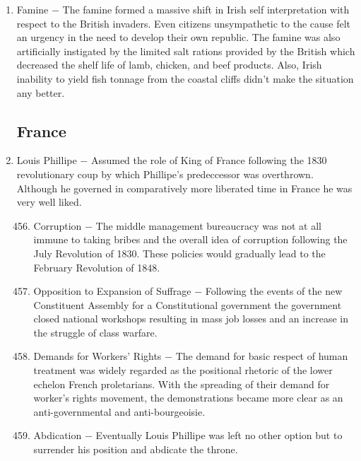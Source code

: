 \documentclass[12pt]{article}
\begin{document}
\begin{enumerate}
\item Famine $-$ The famine formed a massive shift in Irish self interpretation with respect to the British invaders. Even citizens unsympathetic to the cause felt an urgency in the need to develop their own republic. The famine was also artificially instigated by the limited salt rations provided by the British which decreased the shelf life of lamb, chicken, and beef products. Also, Irish inability to yield fish tonnage from the coastal cliffs didn't make the situation any better. 

\subsection{France} 

\item Louis Phillipe $-$ Assumed the role of King of France following the 1830 revolutionary coup by which Phillipe's predeccessor was overthrown. Although he governed in comparatively more liberated time in France he was very well liked.

\begin{enumerate}[label=\arabic{*}.]
\setcounter{enumii}{455}

\item Corruption $-$ The middle management bureaucracy was not at all immune to taking bribes and the overall idea of corruption following the July Revolution of 1830. These policies would gradually lead to the February Revolution of 1848.

\item Opposition to Expansion of Suffrage $-$ Following the events of the new Constituent Assembly for a Constitutional government the government closed national workshops resulting in mass job losses and an increase in the struggle of class warfare.

\item Demands for Workers' Rights $-$ The demand for basic respect of human treatment was widely regarded as the positional rhetoric of the lower echelon French proletarians. With the spreading of their demand for worker's rights movement, the demonstrations became more clear as an anti-governmental and anti-bourgeoisie.

\item Abdication $-$ Eventually Louis Phillipe was left no other option but to surrender his position and abdicate the throne.

\end{enumerate}
\setcounter{enumi}{459}


\end{enumerate}
\end{document}
